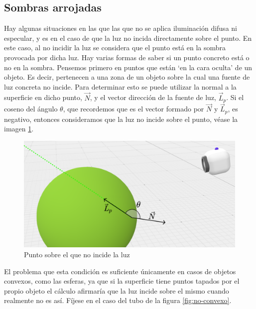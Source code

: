 \subsection{Sombras arrojadas}
\label{subsection:sombras}

Hay algunas situaciones en las que las que no se aplica iluminación difusa ni especular, y es en el caso de que la luz no incida directamente sobre el punto. En este caso, al no incidir la luz se considera que el punto está en la sombra provocada por dicha luz. Hay varias formas de saber si un punto concreto está o no en la sombra. Pensemos primero en puntos que están `en la cara oculta' de un objeto. Es decir, pertenecen a una zona de un objeto sobre la cual una fuente de luz concreta no incide. Para determinar esto se puede utilizar la normal a la superficie en dicho punto, $\vec N$, y el vector dirección de la fuente de luz, $\vec L_p$. Si el coseno del ángulo $\theta$, que recordemos que es el vector formado por $\vec N$ y $\vec L_p$, es negativo, entonces consideramos que la luz no incide sobre el punto, véase la imagen \ref{fig:excepcion}.

\begin{figure} [ht]
    \centering
    \includegraphics[scale = 0.25]{img/C7/excepcion.png}
    \caption{Punto sobre el que no incide la luz}
    \label{fig:excepcion}
\end{figure}

El problema que esta condición es suficiente únicamente en casos de objetos convexos, como las esferas, ya que si la superficie tiene puntos tapados por el propio objeto el cálculo afirmaría que la luz incide sobre el mismo cuando realmente no es así. Fíjese en el caso del tubo de la figura \ref{fig:no-convexo}.

